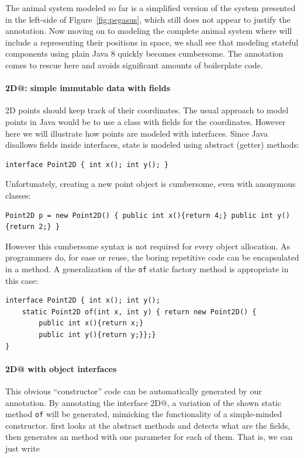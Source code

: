 The animal system modeled so far is a simplified version of the
system presented in the left-side of Figure~\ref{fig:pegasus}, which still does not appear to
justify the \mixinAnn{} annotation.  Now moving on to modeling
the complete animal system where \Q@Animal@s will include a \Q@location@
representing their positions in space, we shall
see that modeling stateful components using plain Java 8 quickly becomes
cumbersome. The \mixinAnn{} annotation comes to rescue here and
 avoids significant amounts of boilerplate code.

\paragraph{\Q@Point2D@: simple immutable data with fields}
2D points should keep track of their coordinates.  The usual
approach to model points in Java would be to use a class with fields for the
coordinates. However here we will illustrate how points are modeled with
interfaces. Since Java disallows fields inside interfaces, state is modeled
using abstract (getter) methods:

\begin{lstlisting}
interface Point2D { int x(); int y(); }
\end{lstlisting}

\noindent Unfortunately, creating a new point object is cumbersome, even
with anonymous classes:

\begin{lstlisting}
Point2D p = new Point2D() { public int x(){return 4;} public int y(){return 2;} }
\end{lstlisting}

\noindent However this cumbersome syntax is not required for every
object allocation. As programmers do, for ease or reuse, the boring
repetitive code can be encapsulated in a method. A generalization of the
\texttt{of} static factory method is appropriate in this case:
\begin{lstlisting}
interface Point2D { int x(); int y();
    static Point2D of(int x, int y) { return new Point2D() {
        public int x(){return x;} 
        public int y(){return y;}};}
}
\end{lstlisting}

\vspace{-5pt}
\paragraph{\Q@Point2D@ with object interfaces}
This obvious ``constructor'' code can be automatically generated by our \mixin
annotation.  By annotating the interface \Q@Point2D@, a variation of the shown
static method \texttt{of} will be generated, mimicking the functionality of a
simple-minded constructor. \mixin first looks at the abstract methods and detects
what are the fields, then generates an \Q@of@ method with one parameter for each
of them. That is, we can just write

